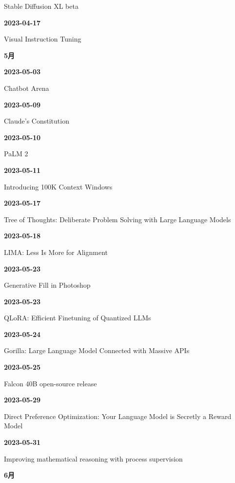 {\raggedright Stable Diffusion XL beta\par}
\smallskip
\noindent\textbf{2023-04-17}\par
{\raggedright Visual Instruction Tuning\par}
\smallskip
\medskip
\noindent\textbf{5月}\par
\smallskip
\noindent\textbf{2023-05-03}\par
{\raggedright Chatbot Arena\par}
\smallskip
\noindent\textbf{2023-05-09}\par
{\raggedright Claude's Constitution\par}
\smallskip
\noindent\textbf{2023-05-10}\par
{\raggedright PaLM 2\par}
\smallskip
\noindent\textbf{2023-05-11}\par
{\raggedright Introducing 100K Context Windows\par}
\smallskip
\noindent\textbf{2023-05-17}\par
{\raggedright Tree of Thoughts: Deliberate Problem Solving with Large Language Models\par}
\smallskip
\noindent\textbf{2023-05-18}\par
{\raggedright LIMA: Less Is More for Alignment\par}
\smallskip
\noindent\textbf{2023-05-23}\par
{\raggedright Generative Fill in Photoshop\par}
\smallskip
\noindent\textbf{2023-05-23}\par
{\raggedright QLoRA: Efficient Finetuning of Quantized LLMs\par}
\smallskip
\noindent\textbf{2023-05-24}\par
{\raggedright Gorilla: Large Language Model Connected with Massive APIs\par}
\smallskip
\noindent\textbf{2023-05-25}\par
{\raggedright Falcon 40B open-source release\par}
\smallskip
\noindent\textbf{2023-05-29}\par
{\raggedright Direct Preference Optimization: Your Language Model is Secretly a Reward Model\par}
\smallskip
\noindent\textbf{2023-05-31}\par
{\raggedright Improving mathematical reasoning with process supervision\par}
\smallskip
\medskip
\noindent\textbf{6月}\par
